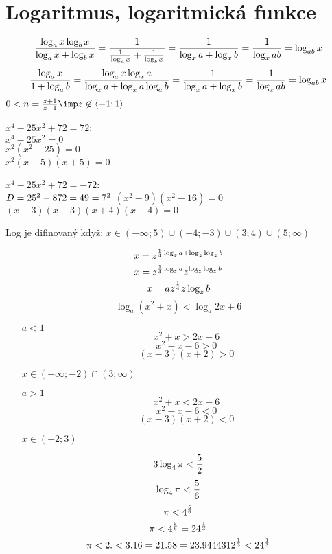 
\BeginDoc{}
\def\dec{\left| 
\begin{array}{ccc}}
\def\dee{\end{array}
\right|}
\def\d{\rm d}
\section{Logaritmus, logaritmická funkce}
$$\f{\log_ax\*\log_bx}{\log_a x + \log_b x}  = \f{1}{\f{1}{\log_a x}+\f1{\log_b x}} = \f1{\log_x a+\log_x b}=\f1{\log_x ab} = \log_{ab} x$$
$$\f{\log_a x}{1+\log_ab} = \f{\log_a x\*\log_x a}{\log_x a + \log_x a \log_a b}= \f1{\log_x a+\log_x b}=\f1{\log_x ab} = \log_{ab} x$$
$0< n = \f{z+1}{z-1} \imp z \not \in \<-1;1\>$

$x^4-25x^2+72=72$:\\
$x^4-25x^2=0$\\
$x^2(x^2-25)=0$\\
$x^2(x-5)(x+5)=0$


$x^4-25x^2+72=-72$:\\
$D=25^2-8\*72 = 49 = 7^2$
$(x^2-9)(x^2-16)=0$\\
$(x+3)(x-3)(x+4)(x-4)=0$

Log je difinovaný když:
$x\in (-\infty;5)\cup(-4;-3)\cup(3;4)\cup(5;\infty)$

$$x=z^{\frac 14 \log_z a + \log_z \log _z  b}$$
$$x=z^{\frac 14 \log_z a}z^{\log_z \log _z  b}$$
$$x=a z^{\frac 14}z \log_z b$$
$$\log_a(x^2+x) < \log_a{2x+6}$$
\begin{enumerate}
	\item [$a<1$]
		$$x^2+x>2x+6$$
		$$x^2-x-6>0$$
		$$(x-3)(x+2)>0$$

		$x\in(-\infty;-2)\cap(3;\infty)$
	\item [$a>1$]
		$$x^2+x<2x+6$$
		$$x^2-x-6<0$$
		$$(x-3)(x+2)<0$$

		$x\in(-2;3)$
\end{enumerate}

$$3\log_4\pi<\frac 52$$
$$\log_4\pi<\frac 56$$
$$\pi<4^{\frac 56}$$
$$\pi<4^{\f 56}= 2\*4^{\f 13}$$
$$\pi<2. < 3.16 = 2\*1.58 = 2\*3.9444312^{\f 13} < 2\* 4^{\f 13}$$
\newpage
{}
\newpage\ \\[-50pt]
\EndDoc
